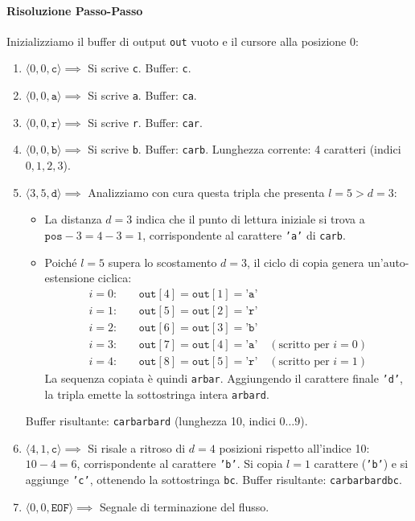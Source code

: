 \paragraph{Risoluzione Passo-Passo}
Inizializziamo il buffer di output \texttt{out} vuoto e il cursore alla posizione 0:
\begin{enumerate}
  \item $\langle 0, 0, \texttt{c} \rangle \implies$ Si scrive \texttt{c}. Buffer: \texttt{c}.
  \item $\langle 0, 0, \texttt{a} \rangle \implies$ Si scrive \texttt{a}. Buffer: \texttt{ca}.
  \item $\langle 0, 0, \texttt{r} \rangle \implies$ Si scrive \texttt{r}. Buffer: \texttt{car}.
  \item $\langle 0, 0, \texttt{b} \rangle \implies$ Si scrive \texttt{b}. Buffer: \texttt{carb}. Lunghezza corrente: 4 caratteri (indici $0, 1, 2, 3$).

  \item $\langle 3, 5, \texttt{d} \rangle \implies$ Analizziamo con cura questa tripla che presenta $l = 5 > d = 3$:
  \begin{itemize}
    \item La distanza $d = 3$ indica che il punto di lettura iniziale si trova a $\texttt{pos} - 3 = 4 - 3 = 1$, corrispondente al carattere \texttt{'a'} di \texttt{carb}.
    \item Poich\'e $l = 5$ supera lo scostamento $d = 3$, il ciclo di copia genera un'auto-estensione ciclica:
    \begin{align*}
      i=0: &\quad \texttt{out}[4] = \texttt{out}[1] = \texttt{'a'} \\
      i=1: &\quad \texttt{out}[5] = \texttt{out}[2] = \texttt{'r'} \\
      i=2: &\quad \texttt{out}[6] = \texttt{out}[3] = \texttt{'b'} \\
      i=3: &\quad \texttt{out}[7] = \texttt{out}[4] = \texttt{'a'} \quad (\text{scritto per } i=0) \\
      i=4: &\quad \texttt{out}[8] = \texttt{out}[5] = \texttt{'r'} \quad (\text{scritto per } i=1)
    \end{align*}
    La sequenza copiata \`e quindi \texttt{arbar}. Aggiungendo il carattere finale \texttt{'d'}, la tripla emette la sottostringa intera \texttt{arbard}.
  \end{itemize}
  Buffer risultante: \texttt{carbarbard} (lunghezza 10, indici $0 \dots 9$).

  \item $\langle 4, 1, \texttt{c} \rangle \implies$ Si risale a ritroso di $d = 4$ posizioni rispetto all'indice 10: $10 - 4 = 6$, corrispondente al carattere \texttt{'b'}. Si copia $l = 1$ carattere (\texttt{'b'}) e si aggiunge \texttt{'c'}, ottenendo la sottostringa \texttt{bc}.
  Buffer risultante: \texttt{carbarbardbc}.

  \item $\langle 0, 0, \texttt{EOF} \rangle \implies$ Segnale di terminazione del flusso.
\end{enumerate}


